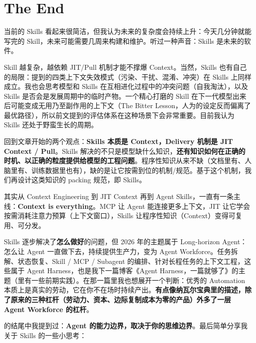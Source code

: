 \section{The End}

当前的 Skills 看起来很简洁，但我认为未来的复杂度会持续上升：今天几分钟就能写完的 Skill，未来可能需要几周来构建和维护。听过一种声音：Skills 是未来的软件。

Skill 越复杂，越依赖 JIT/Pull 机制才能不撑爆 Context。当然，Skills 也有自己的局限：提到的四类上下文失效模式（污染、干扰、混淆、冲突）在 Skills 上同样成立。我也会思考模型和 Skills 在互相进化过程中的冲突问题（自我淘汰），以及 Skills 是否会是发展周期中的临时产物。一个精心打磨的 Skill 在下一代模型出来后可能变成无用乃至副作用的上下文（The Bitter Lesson，人为的设定反而偏离了最优路径），所以前文提到的评估体系在这种场景下会非常重要。目前我认为 Skills 还处于野蛮生长的周期。

回到文章开始的两个观点：\textbf{Skills 本质是 Context，Delivery 机制是 JIT Context / Pull}。Skills 解决的不只是模型缺什么知识，\textbf{还有知识如何在正确的时机、以正确的粒度提供给模型的工程问题}。程序性知识从来不缺（文档里有、人脑里有、训练数据里也有），缺的是让它按需到位的机制/规范。基于这个机制，我们再设计这类知识的 packing 规范，即 Skills。

其实从 Context Engineering 到 JIT Context 再到 Agent Skills，一直有一条主线：\textbf{Context is everything}。MCP 让 Agent 能连接更多上下文，JIT 让它学会按需消耗注意力预算（上下文窗口），Skills 让程序性知识（Context）变得可复用、可分发。

Skills 逐步解决了\textbf{怎么做好}的问题，但 2026 年的主题属于 Long-horizon Agent：怎么让 Agent 一直做下去，持续提供生产力，变为 Agent Workforce。任务拆解、状态恢复、Skill / MCP / Subagent 的编排、针对长程任务的上下文工程，这些属于 Agent Harness，也是我下一篇博客《Agent Harness，一篇就够了》的主题（里有一些前期实践）。在那一篇里我也想展开一个判断：优秀的 Automation 本质上是真实的劳动，它在你不在场时持续产出。\textbf{有点像纳瓦尔宝典里的描述，除了原来的三种杠杆（劳动力、资本、边际复制成本为零的产品）外多了一层 Agent Workforce 的杠杆}。

的结尾中我提到过：\textbf{Agent 的能力边界，取决于你的思维边界}。最后简单分享我关于 Skills 的一些小思考：


